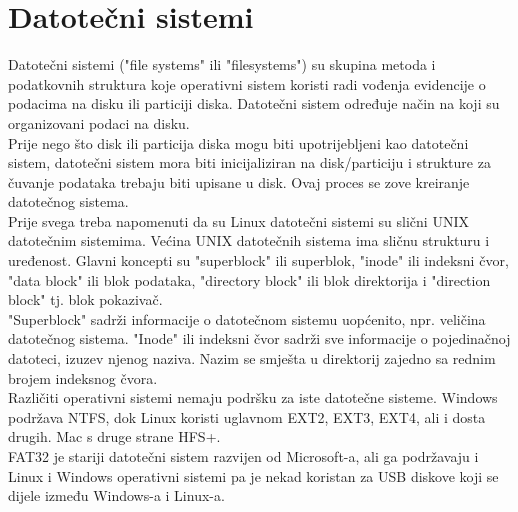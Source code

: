 \documentclass[12pt,vi]{mitthesis}
\begin{document}
\section*{Datotečni sistemi}
\indent
Datotečni sistemi\cite{tldp-guide} ("file systems" ili "filesystems")\cite{wiki-filesystem} su skupina metoda i podatkovnih struktura koje operativni sistem koristi radi vođenja evidencije o podacima na disku ili particiji diska. Datotečni sistem određuje način na koji su organizovani podaci na disku.\\
Prije nego što disk ili particija diska mogu biti upotrijebljeni kao datotečni sistem, datotečni sistem mora biti inicijaliziran na disk/particiju i strukture za čuvanje podataka trebaju biti upisane u disk. Ovaj proces se zove kreiranje datotečnog sistema.\\
Prije svega treba napomenuti da su Linux datotečni sistemi su slični UNIX datotečnim sistemima. Većina UNIX datotečnih sistema ima sličnu strukturu i uređenost. Glavni koncepti su "superblock" ili superblok, "inode" ili indeksni čvor\cite[str.~281]{operativni-sistemi}, "data block" ili blok podataka, "directory block" ili blok direktorija i "direction block" tj. blok pokazivač.\\
"Superblock" sadrži informacije o datotečnom sistemu uopćenito, npr. veličina datotečnog sistema. "Inode" ili indeksni čvor sadrži sve informacije o pojedinačnoj datoteci, izuzev njenog naziva. Nazim se smješta u direktorij zajedno sa rednim brojem indeksnog čvora.\\
Različiti operativni sistemi nemaju podršku za iste datotečne sisteme\cite{wiki-filesystem-comparison}\cite{filesystem-comparison}. Windows podržava NTFS\cite[str.~286]{operativni-sistemi}, dok Linux koristi uglavnom EXT2\cite[~302]{linux-bible}, EXT3\cite[~302]{linux-bible}, EXT4\cite[~302]{linux-bible}, ali i dosta drugih. Mac s druge strane HFS+.\\
FAT32 je stariji datotečni sistem razvijen od Microsoft-a, ali ga podržavaju i Linux i Windows operativni sistemi pa je nekad koristan za USB diskove koji se dijele između Windows-a i Linux-a.
\end{document}
